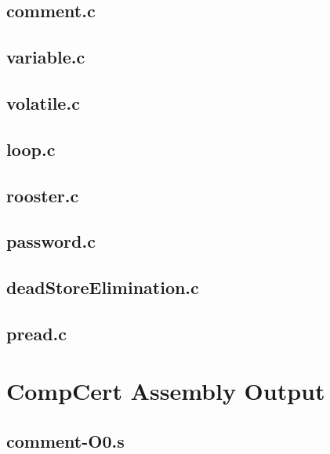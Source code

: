 \begin{appendices}
\subsection{comment.c}


\subsection{variable.c}


\subsection{volatile.c}


\subsection{loop.c}


\subsection{rooster.c}


\subsection{password.c}


\subsection{deadStoreElimination.c}


\subsection{pread.c}


\section{CompCert Assembly Output}
\label{app:compCertAssembly}
\lstset{language=[x64]Assembler}
\subsection{comment-O0.s}


\end{appendices}
